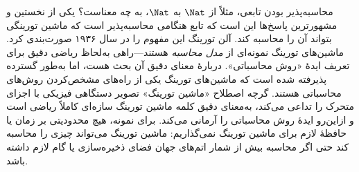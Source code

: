 \documentclass[../../../include/open-logic-section]{subfiles}
\begin{document}

محاسبه‌پذیر بودن تابعی، مثلاً از $\Nat$ به $\Nat$، به چه معناست؟ یکی
از نخستین و مشهورترین پاسخ‌ها این است که تابع هنگامی محاسبه‌پذیر است
که ماشین تورینگی بتواند آن را محاسبه کند. آلن تورینگ این مفهوم را در
سال ۱۹۳۶ صورت‌بندی کرد. ماشین‌های تورینگ نمونه‌ای از \emph{مدل
محاسبه} هستند---راهی به‌لحاظ ریاضی دقیق برای تعریف ایدهٔ «روش
محاسباتی». دربارهٔ معنای دقیق آن بحث هست، اما به‌طور گسترده پذیرفته
شده است که ماشین‌های تورینگ یکی از راه‌های مشخص‌کردن روش‌های محاسباتی
هستند. گرچه اصطلاح «ماشین تورینگ» تصویر دستگاهی فیزیکی با اجزای
متحرک را تداعی می‌کند، به‌معنای دقیق کلمه ماشین تورینگ سازه‌ای کاملاً
ریاضی است و ازاین‌رو ایدهٔ روش محاسباتی را آرمانی می‌کند. برای نمونه،
هیچ محدودیتی بر زمان یا حافظهٔ لازم برای ماشین تورینگ نمی‌گذاریم:
ماشین تورینگ می‌تواند چیزی را محاسبه کند حتی اگر محاسبه بیش از شمار
اتم‌های جهان فضای ذخیره‌سازی یا گام لازم داشته باشد.
\end{document}
